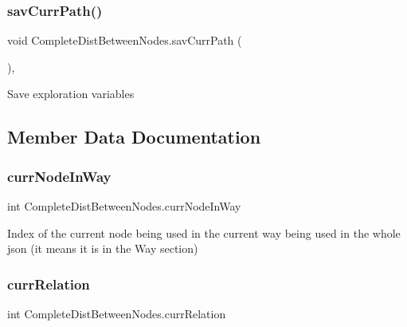 \subsubsection{\texorpdfstring{sav\+Curr\+Path()}{savCurrPath()}}
{\footnotesize\ttfamily void Complete\+Dist\+Between\+Nodes.\+sav\+Curr\+Path (\begin{DoxyParamCaption}{ }\end{DoxyParamCaption})\hspace{0.3cm}{\ttfamily [inline]}, {\ttfamily [private]}}



Save exploration variables 



\subsection{Member Data Documentation}
\mbox{\label{classCompleteDistBetweenNodes_a95b430cff498d73f175ef7e007039396}} 
\subsubsection{\texorpdfstring{curr\+Node\+In\+Way}{currNodeInWay}}
{\footnotesize\ttfamily int Complete\+Dist\+Between\+Nodes.\+curr\+Node\+In\+Way\hspace{0.3cm}{\ttfamily [private]}}



Index of the current node being used in the current way being used in the whole json (it means it is in the \textquotesingle{}Way\textquotesingle{} section)

\mbox{\label{classCompleteDistBetweenNodes_a59b1019044d1b1356aed96518d966b67}} 
\subsubsection{\texorpdfstring{curr\+Relation}{currRelation}}
{\footnotesize\ttfamily int Complete\+Dist\+Between\+Nodes.\+curr\+Relation\hspace{0.3cm}{\ttfamily [private]}}



